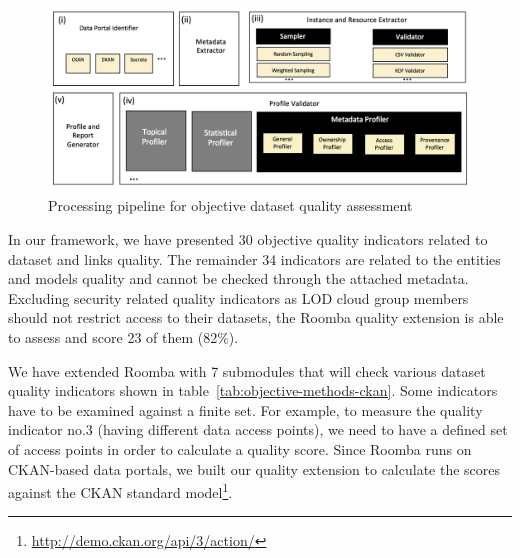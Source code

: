 \documentclass[onecolumn, crcready]{../../Util/LaTEX/iosart2c}
\begin{document}
\begin{figure}[!ht]
  \centering
    \includegraphics[scale=0.5]{figure-1_architecture.png}
  \caption{Processing pipeline for objective dataset quality assessment}
  \label{fig:Roomba_architecture}
\end{figure}

In our framework, we have presented 30 objective quality indicators related to dataset and links quality. The remainder 34 indicators are related to the entities and models quality and cannot be checked through the attached metadata. Excluding security related quality indicators as LOD cloud group members should not restrict access to their datasets, the Roomba quality extension is able to assess and score 23 of them (82\%).

We have extended Roomba with 7 submodules that will check various dataset quality indicators shown in table~\ref{tab:objective-methods-ckan}. Some indicators have to be examined against a finite set. For example, to measure the quality indicator no.3 (having different data access points), we need to have a defined set of access points in order to calculate a quality score. Since Roomba runs on CKAN-based data portals, we built our quality extension to calculate the scores against the CKAN standard model\footnote{\url{http://demo.ckan.org/api/3/action/}}.
\end{document}
